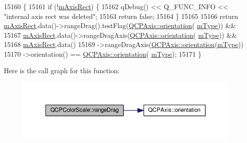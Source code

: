 \begin{DoxyCode}
15160                                     \{
15161   \textcolor{keywordflow}{if} (!\hyperlink{class_q_c_p_color_scale_a6e37f7d49cd614dc50ef1caae60461b9}{mAxisRect}) \{
15162     qDebug() << Q\_FUNC\_INFO << \textcolor{stringliteral}{"internal axis rect was deleted"};
15163     \textcolor{keywordflow}{return} \textcolor{keyword}{false};
15164   \}
15165 
15166   \textcolor{keywordflow}{return} \hyperlink{class_q_c_p_color_scale_a6e37f7d49cd614dc50ef1caae60461b9}{mAxisRect}.data()->rangeDrag().testFlag(\hyperlink{class_q_c_p_axis_a57483f2f60145ddc9e63f3af53959265}{QCPAxis::orientation}(
      \hyperlink{class_q_c_p_color_scale_a7d47ed4ab76f38e50164e9d77fe33789}{mType})) &&
15167          \hyperlink{class_q_c_p_color_scale_a6e37f7d49cd614dc50ef1caae60461b9}{mAxisRect}.data()->rangeDragAxis(\hyperlink{class_q_c_p_axis_a57483f2f60145ddc9e63f3af53959265}{QCPAxis::orientation}(
      \hyperlink{class_q_c_p_color_scale_a7d47ed4ab76f38e50164e9d77fe33789}{mType})) &&
15168          \hyperlink{class_q_c_p_color_scale_a6e37f7d49cd614dc50ef1caae60461b9}{mAxisRect}.data()
15169                  ->rangeDragAxis(\hyperlink{class_q_c_p_axis_a57483f2f60145ddc9e63f3af53959265}{QCPAxis::orientation}(\hyperlink{class_q_c_p_color_scale_a7d47ed4ab76f38e50164e9d77fe33789}{mType}))
15170                  ->orientation() == \hyperlink{class_q_c_p_axis_a57483f2f60145ddc9e63f3af53959265}{QCPAxis::orientation}(
      \hyperlink{class_q_c_p_color_scale_a7d47ed4ab76f38e50164e9d77fe33789}{mType});
15171 \}
\end{DoxyCode}


Here is the call graph for this function\+:\nopagebreak
\begin{figure}[H]
\begin{center}
\leavevmode
\includegraphics[width=350pt]{class_q_c_p_color_scale_a0d45597064cc40bc8a84d11e870c6b05_cgraph}
\end{center}
\end{figure}


\hypertarget{class_q_c_p_color_scale_a1123986a10acda3cdc371e4d97b3326c}{}
